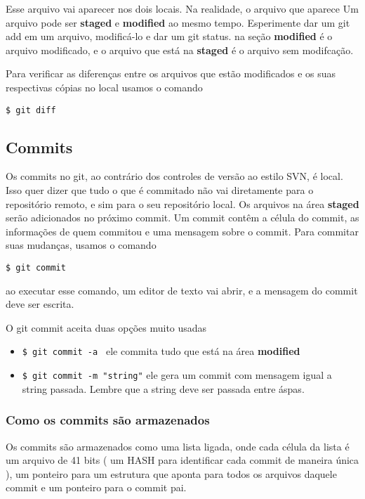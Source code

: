 \documentclass{article}
\begin{document}
Esse arquivo vai aparecer nos dois locais. Na realidade, o arquivo que aparece
    Um arquivo pode ser \textbf{staged} e \textbf{modified} ao mesmo tempo.
Esperimente dar um git add em um arquivo, modificá-lo e dar um git status.
na seção \textbf{modified} é o arquivo modificado, e o arquivo que está na
\textbf{staged} é o arquivo sem modifcação.

    Para verificar as diferenças entre os arquivos que estão modificados e
os suas respectivas cópias no local usamos o comando
\begin{tabbing}
    \hspace{1cm}\=\verb#$ git diff#
\end{tabbing}
    
\subsection{Commits}
    Os commits no git, ao contrário dos controles de versão ao estilo SVN,
é local. Isso quer dizer que tudo o que é commitado não vai diretamente para
o repositório remoto, e sim para o seu repositório local. Os arquivos na área
\textbf{staged} serão adicionados no próximo commit. Um commit contêm a célula
do commit, as informações de quem commitou e uma mensagem sobre o commit. Para
commitar suas mudanças, usamos o comando
\begin{tabbing}
    \hspace{1cm}\=\verb#$ git commit#
\end{tabbing}
    ao executar esse comando, um editor de texto vai abrir, e a mensagem do commit
deve ser escrita.
    
    O git commit aceita duas opções muito usadas
    \begin{itemize}
        \item \verb#$ git commit -a # ele commita tudo que está na área \textbf{modified}
        \item \verb#$ git commit -m "string"# ele gera um commit com mensagem igual a string passada.
            Lembre que a string deve ser passada entre áspas.
    \end{itemize}

\subsubsection{Como os commits são armazenados}
    Os commits são armazenados como uma lista ligada, onde cada célula da lista
é um arquivo de 41 bits ( um HASH para identificar cada commit de maneira única ),
um ponteiro para um estrutura que aponta para todos os arquivos daquele commit e
um ponteiro para o commit pai.
\end{document}
